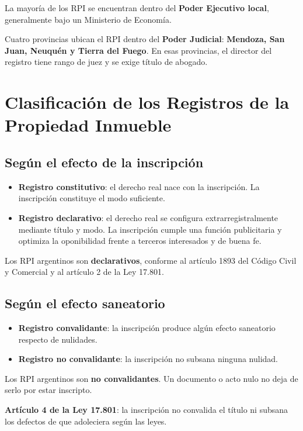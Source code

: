 \documentclass[12pt,oneside]{book}
\begin{document}
La mayoría de los RPI se encuentran dentro del \textbf{Poder Ejecutivo local}, generalmente bajo un Ministerio de Economía.

Cuatro provincias ubican el RPI dentro del \textbf{Poder Judicial}: \textbf{Mendoza, San Juan, Neuquén y Tierra del Fuego}. En esas provincias, el director del registro tiene rango de juez y se exige título de abogado.

\chapter{Clasificación de los Registros de la Propiedad Inmueble}

\section{Según el efecto de la inscripción}

\begin{itemize}
    \item \textbf{Registro constitutivo}: el derecho real nace con la inscripción. La inscripción constituye el modo suficiente.
    \item \textbf{Registro declarativo}: el derecho real se configura extrarregistralmente mediante título y modo. La inscripción cumple una función publicitaria y optimiza la oponibilidad frente a terceros interesados y de buena fe.
\end{itemize}

Los RPI argentinos son \textbf{declarativos}, conforme al artículo 1893 del Código Civil y Comercial y al artículo 2 de la Ley 17.801.

\section{Según el efecto saneatorio}

\begin{itemize}
    \item \textbf{Registro convalidante}: la inscripción produce algún efecto saneatorio respecto de nulidades.
    \item \textbf{Registro no convalidante}: la inscripción no subsana ninguna nulidad.
\end{itemize}

Los RPI argentinos son \textbf{no convalidantes}. Un documento o acto nulo no deja de serlo por estar inscripto.

\begin{important}
\textbf{Artículo 4 de la Ley 17.801}: la inscripción no convalida el título ni subsana los defectos de que adoleciera según las leyes.
\end{important}
\end{document}
